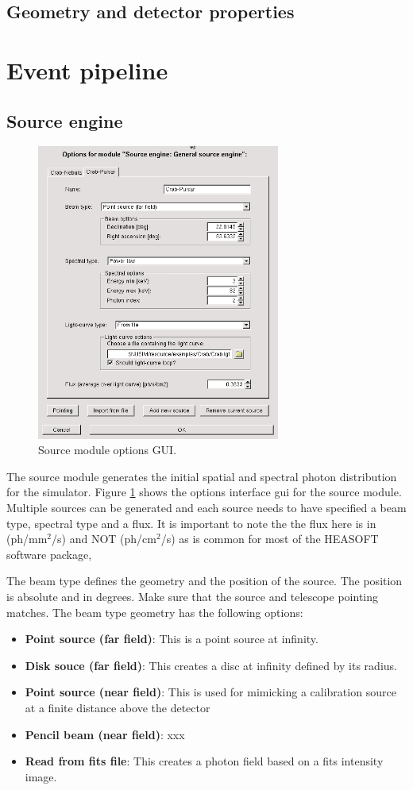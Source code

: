 \subsection{Geometry and detector properties} 

\section{Event pipeline}

\subsection{Source engine}
\begin{figure}[tb]
\begin{center}
\includegraphics[width=8cm]{images/sourceGUI.png}  
\caption{Source module options GUI.}
\label{sourcegui} 
\end{center}
\end{figure}
The source module generates the initial spatial and spectral photon distribution for the simulator. Figure \ref{sourcegui} shows the options interface gui for the source module. Multiple sources can be generated and each source needs to have specified a beam type, spectral type and a flux. It is important to note the the flux here is in (ph/mm$^2$/s) and NOT (ph/cm$^2$/s) as is common for most of the HEASOFT software package,
 
 The beam type defines the geometry and the position of the source. The position is absolute and in degrees. Make sure that the source and telescope pointing matches. The beam type geometry has the following options:
 \begin{itemize}
 \item \textbf{Point source (far field)}: This is a point source at infinity.
 \item \textbf{Disk souce (far field)}: This creates a disc at infinity defined by its radius.
 \item \textbf{Point source (near field)}: This is used for mimicking a calibration source at a finite distance above the detector
 \item \textbf{Pencil beam (near field)}: xxx
 \item \textbf{Read from fits file}: This creates a photon field based on a fits intensity image.
 \end{itemize}
 
